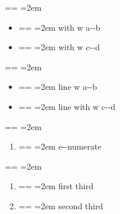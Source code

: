 \documentclass{book}
\makeatletter
\newenvironment{GNUTexinfopreformatted}{%
  \par\obeylines\obeyspaces\frenchspacing
  \parskip=\z@\parindent=\z@}{}
\makeatother
\begin{document}
\begin{GNUTexinfopreformatted}
\leftskip=2em\relax\ttfamily%

\end{GNUTexinfopreformatted}
\begin{itemize}[label={}]
\item \begin{GNUTexinfopreformatted}
\leftskip=2em\relax\ttfamily%
with w a{-}{-}b
\end{GNUTexinfopreformatted}
\item \begin{GNUTexinfopreformatted}
\leftskip=2em\relax\ttfamily%
with w c{-}{-}d
\end{GNUTexinfopreformatted}
\end{itemize}
\begin{GNUTexinfopreformatted}
\leftskip=2em\relax\ttfamily%

\end{GNUTexinfopreformatted}
\begin{itemize}[label=\hbox{} on a line]
\item \begin{GNUTexinfopreformatted}
\leftskip=2em\relax\ttfamily%
line w a{-}{-}b
\end{GNUTexinfopreformatted}
\item \begin{GNUTexinfopreformatted}
\leftskip=2em\relax\ttfamily%
line with w c{-}{-}d
\end{GNUTexinfopreformatted}
\end{itemize}
\begin{GNUTexinfopreformatted}
\leftskip=2em\relax\ttfamily%

\end{GNUTexinfopreformatted}
\begin{enumerate}[start=1]
\item \begin{GNUTexinfopreformatted}
\leftskip=2em\relax\ttfamily%
e{-}{-}numerate
\end{GNUTexinfopreformatted}
\end{enumerate}
\begin{GNUTexinfopreformatted}
\leftskip=2em\relax\ttfamily%

\end{GNUTexinfopreformatted}
\begin{enumerate}[start=3]
\item \begin{GNUTexinfopreformatted}
\leftskip=2em\relax\ttfamily%
first third
\end{GNUTexinfopreformatted}
\item \begin{GNUTexinfopreformatted}
\leftskip=2em\relax\ttfamily%
second third
\end{GNUTexinfopreformatted}
\end{enumerate}
\end{document}
